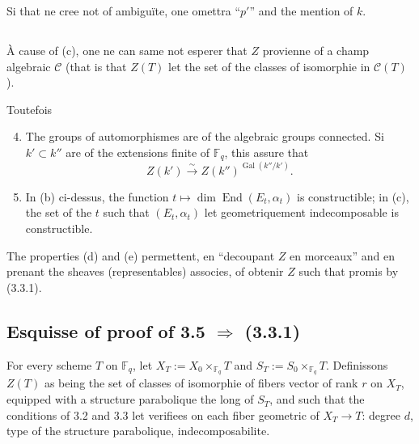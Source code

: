 \documentclass[11pt,a4paper]{article}
\theoremstyle{plain}
\theoremstyle{definition}
\DeclareMathOperator{\Gal}{Gal}
\DeclareMathOperator{\End}{End}
\newcommand{\F}{\mathbb{F}}
\begin{document}
Si that ne cree not of ambigu\"ite, one omettra ``$p'$'' and the mention of $k$.

\subsection{}
\`A cause of (c), one ne can same not esperer that $Z$ provienne of a champ algebraic $\mathcal{C}$ (that is that $Z(T)$ let the set of the classes of isomorphie in $\mathcal{C}(T)$).

Toutefois
\begin{enumerate}[label=(\alph*)]
\setcounter{enumi}{3}
\item The groups of automorphismes are of the algebraic groups connected. Si $k' \subset k''$ are of the extensions finite of $\F_q$, this assure that
\[
Z(k') \xrightarrow{\sim} Z(k'')^{\Gal(k''/k')}.
\]
\item In (b) ci-dessus, the function $t \mapsto \dim \End(E_t, \alpha_t)$ is constructible; in (c), the set of the $t$ such that $(E_t, \alpha_t)$ let geometriquement indecomposable is constructible.
\end{enumerate}

The properties (d) and (e) permettent, en ``decoupant $Z$ en morceaux'' and en prenant the sheaves (representables) associes, of obtenir $Z$ such that promis by (3.3.1).

\subsection{Esquisse of proof of 3.5 $\Rightarrow$ (3.3.1)}
For every scheme $T$ on $\F_q$, let $X_T := X_0 \times_{\F_q} T$ and $S_T := S_0 \times_{\F_q} T$. Definissons $Z(T)$ as being the set of classes of isomorphie of fibers vector of rank $r$ on $X_T$, equipped with a structure parabolique the long of $S_T$, and such that the conditions of 3.2 and 3.3 let verifiees on each fiber geometric of $X_T \to T$: degree $d$, type of the structure parabolique, indecomposabilite.
\end{document}
